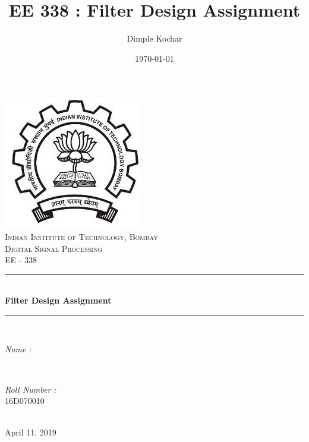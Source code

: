 \documentclass[12pt]{article}
\title{EE 338 : Filter Design Assignment}								%
\author{Dimple Kochar}								%
\date{\today}											%
\makeatletter
\let\theauthor\@author
\makeatother
\begin{document}

\begin{titlepage}
	\centering
    \vspace*{0.3 cm}
    \includegraphics[scale = 0.65]{IIT_B_Logo.jpg}\\[1.0 cm]	%
    \textsc{\Large Indian Institute of Technology, Bombay}\\[2.0 cm]	%
	\textsc{\LARGE Digital Signal Processing}\\[0.5 cm]				%
	\textsc{\Large EE - 338}\\[0.5 cm]				%
	\rule{\linewidth}{0.2 mm} \\[0.4 cm]
	{ \huge \bfseries Filter Design Assignment}\\
	\rule{\linewidth}{0.2 mm} \\[1.5 cm]
	
	\begin{minipage}{0.4\textwidth}
		\begin{flushleft} \large
			\emph{Name :}\\
			\theauthor
			\end{flushleft}
			\end{minipage}~
			\begin{minipage}{0.4\textwidth}
			\begin{flushright} \large
			\emph{Roll Number :} \\
			16\textsc{D}070010									%
		\end{flushright}
	\end{minipage}\\[2 cm]
	
	{\large April 11, 2019}\\[2 cm]
 
	\vfill
	
\end{titlepage}
\end{document}
